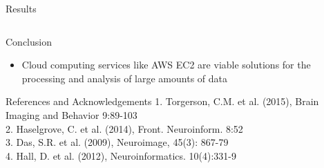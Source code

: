\documentclass[final,hyperref={pdfpagelabels=false}]{beamer}
\begin{document}
\begin{frame}
\begin{columns}
\begin{column}{.5\textwidth}
{\begin{block}{Results}
\begin{column}{.47\textwidth}
          \end{column}
        \end{block}
        \begin{block}{Conclusion}
            \begin{itemize}
                \item Cloud computing services like AWS EC2 are viable solutions for the processing and analysis of large amounts of data
            \end{itemize}
        \end{block}
        \begin{block}{References and Acknowledgements}
            1. Torgerson, C.M. et al. (2015), Brain Imaging and Behavior 9:89-103\\
            2. Haselgrove, C. et al. (2014), Front. Neuroinform. 8:52\\
            3. Das, S.R. et al. (2009), Neuroimage, 45(3): 867-79\\
            4. Hall, D. et al. (2012), Neuroinformatics. 10(4):331-9\\

\end{block}}
\end{column}
\end{columns}
\end{frame}
\end{document}
